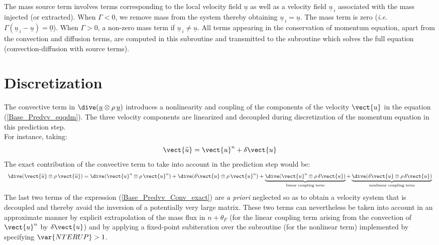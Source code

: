 The mass source term involves terms corresponding to the local velocity field
$\underline {u}$ as well as a velocity field $\underline {u}_{\,i}$
associated with the mass injected (or extracted). When $\Gamma<0$, we remove mass from the system thereby
obtaining $\underline{u}_{\,i} = \underline{u}$. The mass term is zero (\emph{i.e.} $\Gamma
(\underline{u}_{\,i}-\underline{u})= \underline{0} $). When $\Gamma>0$, a non-zero
mass term if $\underline{u}_{\,i} \ne \underline{u}$.
All terms appearing in the conservation of momentum equation, apart from
the convection and diffusion terms, are computed in this subroutine and
transmitted to the
subroutine  which solves the full equation (convection-diffusion with source terms).

\section*{Discretization}

The convective term in $\dive(\underline{u} \otimes \rho\,\underline{u})$
introduces a nonlinearity and coupling of the components of the velocity
$\vect{u}$ in the equation (\ref{Base_Predvv_eqqdm}). The three velocity
components are linearized and decoupled during discretization of the momentum
equation in this prediction step.\\
For instance, taking:
\begin{equation}
\vect{\widetilde{u}}= \vect{u}^n + \delta \vect{u}
\end{equation}
The exact contribution of the convective term to take into account in the prediction step would be:
\begin{equation}\label{Base_Predvv_Conv_exact}
\begin{array}{ll}
\dive(\vect{\widetilde{u}} \otimes \rho\,\vect{\widetilde{u}}) =
\dive(\vect{u}^{n} \otimes \rho\,\vect{u}^{n}) + \dive(\delta \vect{u} \otimes
\rho\,\vect{u}^{n}) +  \underbrace { \dive(\vect{u}^{n} \otimes
\rho\,\delta \vect{u})}_{\text {linear coupling term}} +  \underbrace { \dive(\delta \vect{u} \otimes
\rho\,\delta \vect{u})}_{\text {nonlinear coupling term}}\\
\end{array}
\end{equation}
The last two terms of the expression (\ref{Base_Predvv_Conv_exact}) are {\em a priori} neglected
so as to obtain a velocity system that is decoupled and thereby avoid the
inversion of a potentially very large matrix. These two terms can
nevertheless be taken into account in an approximate manner by explicit
extrapolation of the mass flux in $n+\theta_F$ (for the linear coupling term
arising from the convection of $\vect{u}^{n}$ by $\delta \vect{u}$) and by
applying a fixed-point subiteration over the subroutine  (for
the nonlinear term) implemented by specifying  $\var{NTERUP}>1$.


